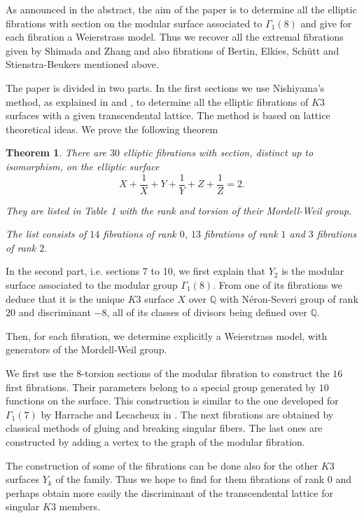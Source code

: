 \documentclass{amsart}
\newtheorem{theo}{Theorem}
\begin{document}
As announced in the abstract, the aim of the paper is to determine all the elliptic fibrations with section on the modular surface associated to $\Gamma_1(8)$ and give for each fibration a Weierstrass model. Thus we recover all the extremal fibrations given by Shimada and Zhang and also fibrations of Bertin, Elkies, Sch\"{u}tt and Stienstra-Beukers mentioned above.

The paper is divided in two parts. In the first sections we use Nishiyama's method, as explained in \cite{Nis} and \cite{SS}, to determine all the elliptic fibrations of $K3$ surfaces with a given transcendental lattice. The method is based on lattice theoretical ideas. We prove the following theorem
\begin{theo}
There are $30$ elliptic fibrations with section, distinct up to isomorphism, on the elliptic surface
$$X+\frac {1}{X}+Y+\frac {1}{Y}+Z+\frac {1}{Z}=2.$$

They are listed in Table 1 with the rank and torsion of their Mordell-Weil group. 

The list consists of $14$ fibrations of rank $0$, $13$ fibrations of rank $1$ and $3$ fibrations of rank $2$.
\end{theo}

In the second part, i.e. sections 7 to 10, we first explain that $Y_2$ is the modular surface associated to the modular group $\Gamma_1(8)$. From one of its fibrations we deduce that it is the unique $K3$ surface $X$ over $\mathbb Q$ with N\'eron-Severi group of rank $20$ and discriminant $-8$, all of its classes of divisors being defined over $\mathbb Q$.

Then, for each fibration, we determine explicitly a Weierstrass model, with generators of the Mordell-Weil group. 

We first use the $8$-torsion sections of the modular fibration to construct the $16$ first fibrations. Their parameters belong to a special group generated by  $10$ functions on the surface. This construction is similar to the one developed for $\Gamma_1(7)$ by Harrache and Lecacheux in \cite{HL}. The next fibrations are obtained by classical methods of gluing and breaking singular fibers. The last ones are constructed by adding a vertex to the graph of the modular fibration.

The construction of some of the fibrations can be done also for the other $K3$ surfaces $Y_k$ of the family. Thus we hope to find for them fibrations of rank $0$ and perhaps obtain more easily the discriminant of the transcendental lattice for singular $K3$ members.
\end{document}
